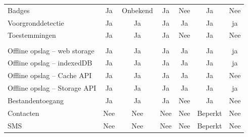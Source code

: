 \begin{table}[]
\begin{tabular}{p{6cm}cccccc}
			   Badges & \cellcolor{green!40} Ja  & \cellcolor{orange!50} Onbekend & \cellcolor{green!40} Ja & \cellcolor{red!50} Nee  & \cellcolor{green!40} Ja & \cellcolor{red!50} Nee \\
			   
			   Voorgronddetectie & \cellcolor{green!40} Ja  & \cellcolor{green!40} Ja & \cellcolor{green!40} Ja  & \cellcolor{green!40} Ja & \cellcolor{green!40} Ja & \cellcolor{green!40} ja \\
			   
			   Toestemmingen & \cellcolor{green!40} Ja  & \cellcolor{green!40} Ja & \cellcolor{green!40} Ja & \cellcolor{red!50} Nee  & \cellcolor{green!40} Ja & \cellcolor{red!50} Nee \\
			   
			   &  & &  &  &  &  \\
			   
			   Offline opslag – web storage & \cellcolor{green!40} Ja  & \cellcolor{green!40} Ja & \cellcolor{green!40} Ja  & \cellcolor{green!40} Ja & \cellcolor{green!40} Ja & \cellcolor{green!40} ja \\
			   
			   Offline opslag – indexedDB & \cellcolor{green!40} Ja  & \cellcolor{green!40} Ja & \cellcolor{green!40} Ja  & \cellcolor{green!40} Ja & \cellcolor{green!40} Ja & \cellcolor{green!40} ja \\
			   
			   Offline opslag – Cache API & \cellcolor{green!40} Ja  & \cellcolor{green!40} Ja & \cellcolor{green!40} Ja  & \cellcolor{green!40} Ja & \cellcolor{green!40} Ja & \cellcolor{red!50} Nee\\
			   
			   Offline opslag – Storage API & \cellcolor{green!40} Ja  & \cellcolor{green!40} Ja & \cellcolor{green!40} Ja  & \cellcolor{green!40} Ja & \cellcolor{green!40} Ja & \cellcolor{green!40} ja \\
			   
			   Bestandentoegang & \cellcolor{green!40} Ja  & \cellcolor{green!40} Ja & \cellcolor{green!40} Ja & \cellcolor{red!50} Nee  & \cellcolor{green!40} Ja & \cellcolor{red!50} Nee \\
			   
			   Contacten &  \cellcolor{red!50} Nee  &  \cellcolor{red!50} Nee &  \cellcolor{red!50} Nee  & \cellcolor{red!50} Nee &  \cellcolor{orange!50} Beperkt &  \cellcolor{red!50} Nee \\
			   
			   SMS &  \cellcolor{red!50} Nee  &  \cellcolor{red!50} Nee &  \cellcolor{red!50} Nee  & \cellcolor{red!50} Nee &  \cellcolor{orange!50} Beperkt &  \cellcolor{red!50} Nee \\
			   

\end{tabular}
\end{table}
